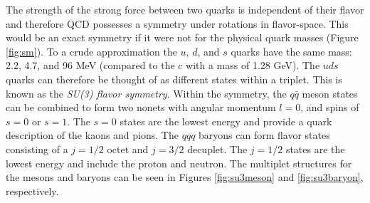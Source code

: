 The strength of the strong force between two quarks is independent of their flavor and therefore QCD possesses a symmetry under rotations in flavor-space. This would be an exact symmetry if it were not for the physical quark masses (Figure \ref{fig:sm}). To a crude approximation the $u$, $d$, and $s$ quarks have the same mass: 2.2, 4.7, and 96 MeV (compared to the $c$ with a mass of 1.28 GeV). The $uds$ quarks can therefore be thought of as different states within a triplet. This is known as the \textit{SU(3) flavor symmetry}. Within the symmetry, the $q\bar{q }$ meson states can be combined to form two nonets with angular momentum $l=0$, and spins of $s=0$ or $s=1$. The $s=0$ states are the lowest energy and provide a quark description of the kaons and pions. The $qqq$ baryons can form flavor states consisting of a $j=1/2$ octet and $j=3/2$ decuplet. The $j=1/2$ states are the lowest energy and include the proton and neutron. The multiplet structures for the mesons and baryons can be seen in Figures \ref{fig:su3meson} and \ref{fig:su3baryon}, respectively.


